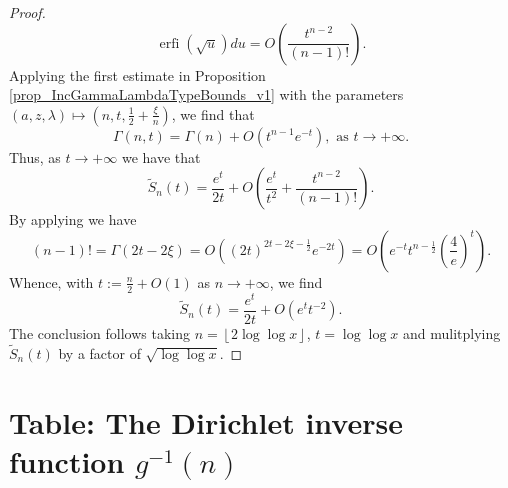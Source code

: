 \documentclass[11pt,reqno,a4letter]{article}
\numberwithin{figure}{section}
\numberwithin{table}{section}
\newcommand{\floor}[1]{\left\lfloor #1 \right\rfloor}
\theoremstyle{plain}
\numberwithin{theorem}{section}
\theoremstyle{definition}
\begin{document}
\begin{proof}
\[     \operatorname{erfi}\left(\sqrt{u}\right) du = 
     O\left(\frac{t^{n-2}}{(n-1)!}\right). 
\]
Applying the first estimate in 
Proposition \ref{prop_IncGammaLambdaTypeBounds_v1} with the parameters 
$(a, z, \lambda) \mapsto \left(n, t, \frac{1}{2} + \frac{\xi}{n}\right)$, 
we find that 
\[
\Gamma(n, t) = \Gamma(n) + O\left(t^{n-1} e^{-t}\right), \text{\ as\ } t \rightarrow + \infty.
\]
Thus, as $t \rightarrow +\infty$ we have that 
\[
\widetilde{S}_n(t) = \frac{e^t}{2t} + O\left(\frac{e^t}{t^2} + \frac{t^{n-2}}{(n-1)!}\right). 
\]
By applying \cite[Eq.\ (5.11.8)]{NISTHB} we have 
\[
(n-1)! = \Gamma(2t-2\xi) = O\left((2t)^{2t-2\xi-\frac{1}{2}} e^{-2t}\right) = 
     O\left(e^{-t} t^{n-\frac{1}{2}} \left(\frac{4}{e}\right)^t\right). 
\]
Whence, with $t := \frac{n}{2} + O(1)$ as $n \rightarrow +\infty$, we find 
\[
\widetilde{S}_n(t) = \frac{e^t}{2t} + O\left(e^t t^{-2}\right). 
\]
The conclusion follows taking $n = \floor{2\log\log x}$, $t = \log\log x$ and 
mulitplying $\widetilde{S}_n(t)$ by a factor of $\sqrt{\log\log x}$. 
\end{proof}

\newpage
\section{Table: The Dirichlet inverse function $g^{-1}(n)$} 
\label{table_conjecture_Mertens_ginvSeq_approx_values}
\end{document}
